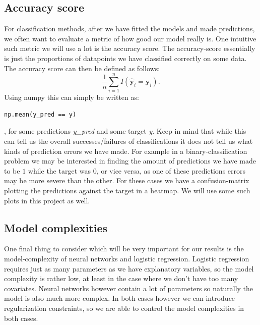 \documentclass{article}
\begin{document}
\subsection{Accuracy score}
For classification methods, after we have fitted the models and made predictions,
we often want to evaluate a metric of how good our model really is. One intuitive
such metric we will use a lot is the accuracy score. The accuracy-score
essentially is just the proportions of datapoints we have classified correctly
on some data. The accuracy score can then be defined as follows:
$$\frac{1}{n} \sum_{i=1}^n I(\hat{\bm{y}}_i = \bm{y}_i).$$
Using numpy this can simply be written as:
\begin{lstlisting}
np.mean(y_pred == y)
\end{lstlisting}
, for some predictions \textit{y\_pred} and some target \textit{y}. Keep in mind
that while this can tell us the overall successes/failures of classifications it
does not tell us what kinds of prediction errors we have made. For example in a
binary-classification problem we may be interested in finding the amount of
predictions we have made to be $1$ while the target was $0$, or vice versa, as
one of these predictions errors may be more severe than the other. For these
cases we have a confusion-matrix plotting the predictions against the target in
a heatmap. We will use some such plots in this project as well.

\subsection{Model complexities}
One final thing to consider which will be very important for our results is the
model-complexity of neural networks and logistic regression. Logistic regression
requires just as many parameters as we have explanatory variables, so the model
complexity is rather low, at least in the case where we don't have too many
covariates. Neural networks however contain a lot of parameters so naturally the
model is also much more complex. In both cases however we can introduce
regularization constraints, so we are able to control the model complexities in
both cases.
\end{document}
